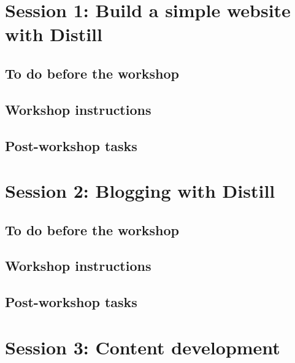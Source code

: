 \documentclass[
]{article}
\begin{document}
\hypertarget{session-1-build-a-simple-website-with-distill}{%
\section{Session 1: Build a simple website with Distill}\label{session-1-build-a-simple-website-with-distill}}

\hypertarget{to-do-before-the-workshop}{%
\subsection{To do before the workshop}\label{to-do-before-the-workshop}}

\hypertarget{workshop-instructions}{%
\subsection{Workshop instructions}\label{workshop-instructions}}

\hypertarget{post-workshop-tasks}{%
\subsection{Post-workshop tasks}\label{post-workshop-tasks}}

\hypertarget{session-2-blogging-with-distill}{%
\section{Session 2: Blogging with Distill}\label{session-2-blogging-with-distill}}

\hypertarget{to-do-before-the-workshop-1}{%
\subsection{To do before the workshop}\label{to-do-before-the-workshop-1}}

\hypertarget{workshop-instructions-1}{%
\subsection{Workshop instructions}\label{workshop-instructions-1}}

\hypertarget{post-workshop-tasks-1}{%
\subsection{Post-workshop tasks}\label{post-workshop-tasks-1}}

\hypertarget{session-3-content-development}{%
\section{Session 3: Content development}\label{session-3-content-development}}
\end{document}
